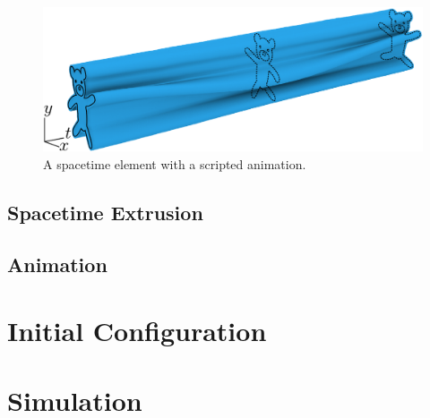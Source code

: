 \begin{figure}
\centering
\includegraphics[width=1.0\columnwidth]{figures/animationpak/spacetime_element.pdf} 
\caption[A spacetime element with a scripted animation]
{\label{fig_spacetime_element} 
A spacetime element with a scripted animation.}
\end{figure}


\subsection{Spacetime Extrusion}


\subsection{Animation}


\section{Initial Configuration}


\section{Simulation}


